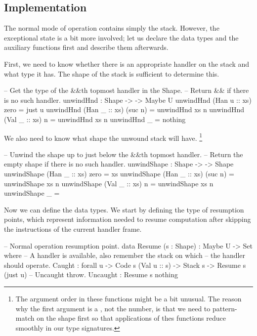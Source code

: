 \subsection{Implementation}

The normal mode of operation contains simply the stack. However, the exceptional state
is a bit more involved; let us declare the data types and the auxiliary functions first
and describe them afterwards.

First, we need to know whether there is an appropriate handler on the stack and what type
it has. The shape of the stack is sufficient to determine this.
\begin{code}
  -- Get the type of the &&\-th top\-most handler in the Shape.
  -- Return && if there is no such handler.
  unwindHnd : Shape -> \bN -> Maybe U
  unwindHnd (Han u :: xs) zero    = just u
  unwindHnd (Han _ :: xs) (suc n) = unwindHnd xs n
  unwindHnd (Val _ :: xs) n       = unwindHnd xs n
  unwindHnd \NIL           _       = nothing
\end{code}

\noindent We also need to know what shape the unwound stack will have.%
\footnote{The argument order in these functions might be a bit unusual. The reason
why the first argument is a , not the number, is that we need to
pattern-match on the shape first so that applications of thes functions reduce
smoothly in our type signatures.}
\\ \begin{minipage}{\textwidth}
\begin{code}
  -- Unwind the shape up to just below the &&\-th top\-most handler.
  -- Return the empty shape if there is no such handler.
  unwindShape : Shape -> \bN -> Shape
  unwindShape (Han _ :: xs) zero    = xs
  unwindShape (Han _ :: xs) (suc n) = unwindShape xs n
  unwindShape (Val _ :: xs) n       = unwindShape xs n
  unwindShape \NIL           _       = \NIL
\end{code}\label{sec:ham-unwindShape}\end{minipage}

\noindent Now we can define the data types. We start by defining the type of resumption points,
which represent information needed to resume computation after skipping the instructions
of the current handler frame.
\begin{code}
  -- Normal operation resumption point.
  data Resume (s : Shape) : Maybe U -> Set where
    -- A handler is available, also remember the stack on which
    -- the handler should operate.
    Caught : forall {u} -> Code s (Val u :: s) -> Stack s -> Resume s (just u)
    -- Uncaught throw.
    Uncaught : Resume s nothing
\end{code}

